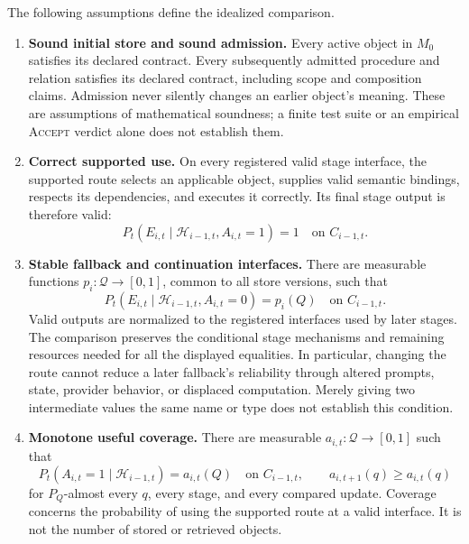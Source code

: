 \documentclass[10pt]{article} %
\providecommand{\1}{\mathbf{1}}  %
\theoremstyle{remark}
\theoremstyle{definition}
\begin{document}
The following assumptions define the idealized comparison.
\begin{enumerate}[label=(\roman*),itemsep=3pt,topsep=3pt]

\item \textbf{Sound initial store and sound admission.}
Every active object in $M_0$ satisfies its declared contract. Every
subsequently admitted procedure and relation satisfies its declared
contract, including scope and composition claims. Admission never
silently changes an earlier object's meaning. These are assumptions of
mathematical soundness; a finite test suite or an empirical
\textsc{Accept} verdict alone does not establish them.

\item \textbf{Correct supported use.}
On every registered valid stage interface, the supported route selects
an applicable object, supplies valid semantic bindings, respects its
dependencies, and executes it correctly. Its final stage output is
therefore valid:
\begin{equation}
P_t(E_{i,t}\mid\mathcal H_{i-1,t},A_{i,t}=1)=1
\quad\text{on }C_{i-1,t}.
\label{eq:reuse-supported-soundness}
\end{equation}

\item \textbf{Stable fallback and continuation interfaces.}
There are measurable functions $p_i:\mathcal Q\to[0,1]$, common to all
store versions, such that
\begin{equation}
P_t(E_{i,t}\mid\mathcal H_{i-1,t},A_{i,t}=0)=p_i(Q)
\quad\text{on }C_{i-1,t}.
\label{eq:reuse-stable-fallback}
\end{equation}
Valid outputs are normalized to the registered interfaces used by later
stages. The comparison preserves the conditional stage mechanisms and
remaining resources needed for all the displayed equalities. In
particular, changing the route cannot reduce a later fallback's
reliability through altered prompts, state, provider behavior, or
displaced computation. Merely giving two intermediate values the same
name or type does not establish this condition.

\item \textbf{Monotone useful coverage.}
There are measurable $a_{i,t}:\mathcal Q\to[0,1]$ such that
\begin{equation}
P_t(A_{i,t}=1\mid\mathcal H_{i-1,t})=a_{i,t}(Q)
\quad\text{on }C_{i-1,t},
\qquad
a_{i,t+1}(q)\geq a_{i,t}(q)
\label{eq:reuse-monotone-coverage}
\end{equation}
for $P_Q$-almost every $q$, every stage, and every compared update.
Coverage concerns the probability of using the supported route at a
valid interface. It is not the number of stored or retrieved objects.


\end{enumerate}
\end{document}
